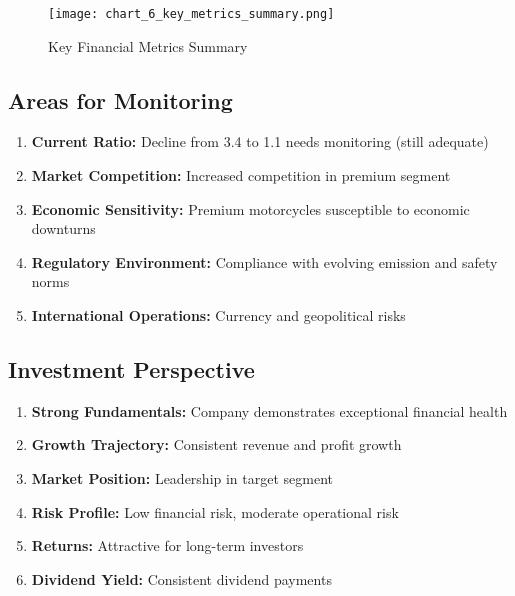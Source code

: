 \documentclass[8pt,a4paper]{article}
\begin{document}

\begin{figure}[H]
\centering
\texttt{[image: chart\_6\_key\_metrics\_summary.png]}
\caption{Key Financial Metrics Summary}
\label{fig:assets_growth}
\end{figure}

\subsection{Areas for Monitoring}

\begin{enumerate}
    \item \textbf{Current Ratio:} Decline from 3.4 to 1.1 needs monitoring (still adequate)
    \item \textbf{Market Competition:} Increased competition in premium segment
    \item \textbf{Economic Sensitivity:} Premium motorcycles susceptible to economic downturns
    \item \textbf{Regulatory Environment:} Compliance with evolving emission and safety norms
    \item \textbf{International Operations:} Currency and geopolitical risks
\end{enumerate}

\subsection{Investment Perspective}

\begin{enumerate}
    \item \textbf{Strong Fundamentals:} Company demonstrates exceptional financial health
    \item \textbf{Growth Trajectory:} Consistent revenue and profit growth
    \item \textbf{Market Position:} Leadership in target segment
    \item \textbf{Risk Profile:} Low financial risk, moderate operational risk
    \item \textbf{Returns:} Attractive for long-term investors
    \item \textbf{Dividend Yield:} Consistent dividend payments
\end{enumerate}
\end{document}
